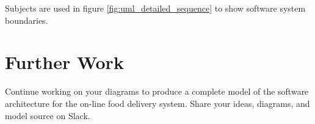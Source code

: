 \documentclass{csse4400}
\begin{document}
\filbreak
Subjects are used in figure \ref{fig:uml_detailed_sequence} to show software system boundaries.





\newpage
\section{Further Work}
Continue working on your diagrams to produce a complete model of the software architecture for the on-line food delivery system.
Share your ideas, diagrams, and model source on Slack.




\end{document}
